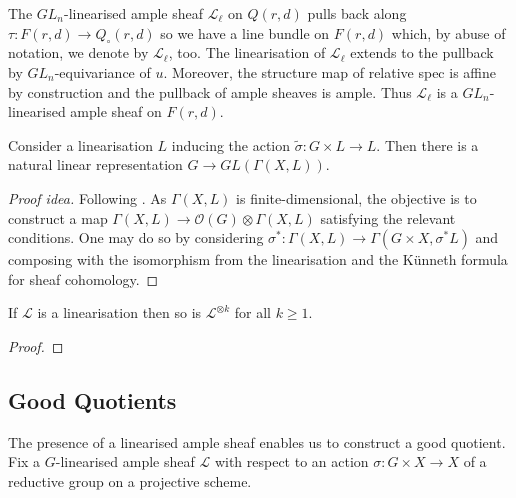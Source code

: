 \documentclass[12pt]{ociamthesis}  %
\begin{document}
\begin{example}
  The $GL_n$-linearised ample sheaf $\mathscr L_\ell$ on
  $Q(r,d)$ pulls back along $\tau:F(r,d)\to Q_\circ(r,d)$ so
  we have a line bundle on $F(r,d)$ which, by abuse of
  notation, we denote by $\mathscr L_\ell$, too. The
  linearisation of $\mathscr L_\ell$ extends to the pullback by
  $GL_n$-equivariance of $u$. Moreover, the structure
  map of relative spec is affine by construction and the
  pullback of ample sheaves is ample. Thus $\mathscr L_\ell$
  is a $GL_n$-linearised ample sheaf on $F(r,d)$.
\end{example}

\begin{lemma}\label{lem:linearisations_give_reps}
  Consider a linearisation $L$ inducing the action
  $\tilde\sigma : G\times L\to L$.
  Then there is a natural linear representation $G\to GL(\Gamma(X,L))$.
  \begin{proof}[Proof idea]
    Following \cite[Lemma 5.19]{hoskins2016}. As $\Gamma(X,L)$
    is finite-dimensional, the objective is to construct a map
    $\Gamma(X,L) \to \mathscr O(G) \otimes \Gamma(X,L)$
    satisfying the relevant conditions. One may do so by considering
    $\sigma^* : \Gamma(X,L) \to \Gamma(G\times X,\sigma^*L)$ and
    composing with the isomorphism from the linearisation and
    the K\"unneth formula for sheaf cohomology.
  \end{proof}
\end{lemma}

\begin{lemma}
  If $\mathscr L$ is a linearisation then so is $\mathscr L^{\otimes k}$
  for all $k\geq 1$.
  \begin{proof}
    \missingproof
  \end{proof}
\end{lemma}

\subsection{Good Quotients}

The presence of a linearised ample sheaf enables us to construct a good
quotient.  Fix a $G$-linearised ample sheaf $\mathscr L$ with respect to an
action $\sigma : G\times X\to X$ of a reductive group on a projective scheme.
\end{document}

